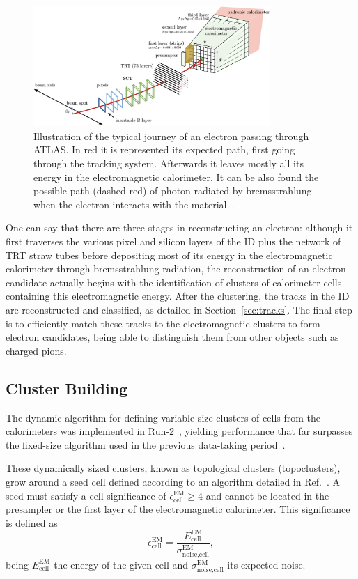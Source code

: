 \begin{figure}[htbp]
  \centering
  \includegraphics[width=0.8\textwidth]{images/electron_journey.png}
  \caption{Illustration of the typical journey of an electron passing through ATLAS. In red it is represented its expected path, first going through the tracking system. Afterwards it leaves mostly all its energy in the electromagnetic calorimeter. It can be also found the possible path (dashed red) of photon radiated by bremsstrahlung when the electron interacts with the material~\cite{Aaboud:2657964}.}
  \label{electron_journey}
\end{figure}
One can say that there are three stages in reconstructing an electron: although it first traverses the various pixel and silicon layers of the ID plus the network of TRT straw tubes before depositing most of its energy in the electromagnetic calorimeter through bremsstrahlung radiation, the reconstruction of an electron candidate actually begins with the identification of clusters of calorimeter cells containing this electromagnetic energy. After the clustering, 
the tracks in the ID are reconstructed and classified, as detailed in Section~\ref{sec:tracks}. The final step is to efficiently match these tracks to the electromagnetic clusters to form electron candidates, being able to distinguish them from other objects such as charged pions.

\subsection{Cluster Building}

The dynamic algorithm for defining variable-size clusters of cells from the calorimeters was implemented in Run-2~\cite{dyn_clust}, yielding performance that far surpasses the fixed-size algorithm used in the previous data-taking period~\cite{fix_clust}.

These dynamically sized clusters, known as topological clusters (topoclusters), grow around a seed cell defined according to an algorithm detailed in Ref.~\cite{fix_clust}. A seed must satisfy a cell significance of $\epsilon_{\text{cell}}^{\text{EM}} \geq 4$
and cannot be located in the presampler or the first layer of the electromagnetic calorimeter. This significance is defined as
\begin{equation}
  \epsilon_{\text{cell}}^{\text{EM}} = \frac{E_{\text{cell}}^{\text{EM}}}{\sigma^{\text{EM}}_{\text{noise,cell}}},
\end{equation}
being \(E_{\text{cell}}^{\text{EM}}\) the energy of the given cell and \(\sigma^{\text{EM}}_{\text{noise,cell}}\) its expected noise.

